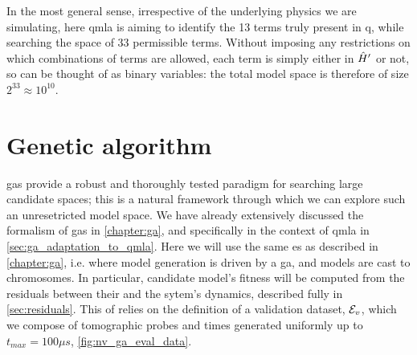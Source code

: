 In the most general sense, irrespective of the underlying physics we are simulating, 
    here \gls{qmla} is aiming to identify the 13 terms truly present in \gls{q}, 
    while searching the space of 33 permissible terms. 
Without imposing any restrictions on which combinations of terms are allowed, 
    each term is simply either in $\hat{H}^{\prime}$ or not, so can be thought of as binary variables:
    the total \gls{model space} is therefore of size $2^{33} \approx 10^{10}$. 

\section{Genetic algorithm}
\Glspl{ga} provide a robust and thoroughly tested paradigm for searching large candidate spaces; 
    this is a natural framework through which we can explore such an unresetricted model space. 
We have already extensively discussed the formalism of \glspl{ga} in \cref{chapter:ga}, 
    and specifically in the context of \gls{qmla} in \cref{sec:ga_adaptation_to_qmla}.
Here we will use the same \gls{es} as described in \cref{chapter:ga}, 
    i.e. where model generation is driven by a \gls{ga}, 
    and models are cast to chromosomes. 
In particular, candidate model's fitness will be computed from the residuals
    between their and the sytem's dynamics, described fully in \cref{sec:residuals}. 
This \acrfull{of} relies on the definition of a validation dataset, ${ \mathcal{E} }_v$,
    which we compose of tomographic probes and times generated uniformly up to 
    $t_{max} = 100 \mu s$, \cref{fig:nv_ga_eval_data}. 

